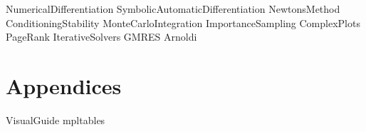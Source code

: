\documentclass[opener-c,labs,blue,nociteref]{HJnewsiambook}
\begin{document}
{NumericalDifferentiation}
{SymbolicAutomaticDifferentiation}
{NewtonsMethod}
{ConditioningStability}
{MonteCarloIntegration}
{ImportanceSampling}
{ComplexPlots}
{PageRank}
{IterativeSolvers}
{GMRES}
{Arnoldi}

\part{Appendices} %
\begin{appendices}
{VisualGuide}
{mpltables}
\end{appendices}
\end{document}
